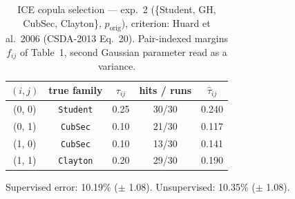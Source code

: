 \begin{table}[htbp]
  \centering
  \caption{ICE copula selection — exp.\ 2 (\{Student, GH, CubSec, Clayton\}, $p_{\text{orig}}$), criterion: Huard et al.\ 2006 (CSDA-2013 Eq.\ 20). Pair-indexed margins $f_{ij}$ of Table~1, second Gaussian parameter read as a variance.}
  \label{tab:exp3-exp2_orig_p__huard}
  \begin{tabular}{ccccc}
    \toprule
    $(i, j)$ & true family & $\tau_{ij}$ & hits / runs & $\hat\tau_{ij}$ \\
    \midrule
    (0, 0) & \texttt{Student} & 0.25 & 30/30 & 0.240 \\
    (0, 1) & \texttt{CubSec} & 0.10 & 21/30 & 0.117 \\
    (1, 0) & \texttt{CubSec} & 0.10 & 13/30 & 0.141 \\
    (1, 1) & \texttt{Clayton} & 0.20 & 29/30 & 0.190 \\
    \bottomrule
  \end{tabular}
  \par\smallskip Supervised error: 10.19\% ($\pm$ 1.08). Unsupervised: 10.35\% ($\pm$ 1.08).
\end{table}
